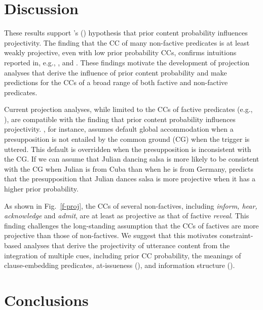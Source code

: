 \documentclass[11pt,fleqn]{article}
\newcommand{\6}{\mbox{$[\hspace*{-.6mm}[$}}
\newcommand{\9}{\mbox{$]\hspace*{-.6mm}]$}}
\newcommand{\citetpos}[1]{\citeauthor{#1}'s (\citeyear{#1})}
\begin{document}
\section{Discussion}

These results support \citetpos{tbd-variability} hypothesis that prior content probability influences projectivity. The finding that the CC of many non-factive predicates is at least weakly projective, even with low prior probability CCs, confirms intuitions reported in, e.g., \citealt{schlenker10}, \citealt{anand-hacquard2014} and \citealt{spector-egre2015}. These findings motivate the development of projection analyses that derive the influence of prior content probability and make predictions for the CCs of a broad range of both factive and non-factive predicates.

Current projection analyses, while limited to the CCs of factive predicates (e.g., \citealt{heim83,vds92,abrusan2011,brst-salt10,brst-ar}), are compatible with the finding that prior content probability influences projectivity. \citealt{heim83}, for instance, assumes default global accommodation when a presupposition is not entailed by the common ground (CG) when the trigger is uttered. This default is overridden when the presupposition is inconsistent with the CG. If we can assume that Julian dancing salsa is more likely to be consistent with the CG when Julian is from Cuba than when he is from Germany, \citealt{heim83} predicts that the presupposition that Julian dances salsa is more projective when it has a higher prior probability. 

As shown in Fig.~\ref{f-proj}, the CCs of several non-factives, including {\em inform, hear, acknowledge} and {\em admit}, are at least as projective as that of factive {\em reveal}. This finding challenges the long-standing assumption that the CCs of factives are more projective than those of non-factives. We suggest that this motivates constraint-based analyses that derive the projectivity of utterance content from the integration of multiple cues, including prior CC probability, the meanings of clause-embedding predicates, at-issueness (\citealt{tbd-variability}), and information structure (\citealt{tonhauser-salt26}).

\section{Conclusions}

\appendix

\setcounter{table}{0}
\renewcommand{\thetable}{A\arabic{table}}
\end{document}
